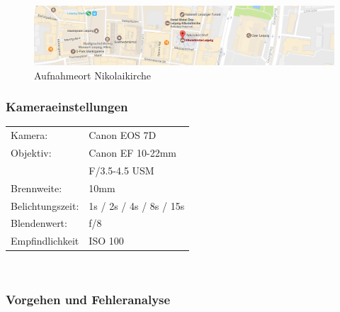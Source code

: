 \documentclass[liststotoc,bibtotoc,fontsize=14pt,]{scrreprt}
\begin{document}
\bisgskip

\begin{figure}[H]
	\includegraphics[width=\linewidth]{img/places/nikolai_map.jpg}
	\caption{Aufnahmeort Nikolaikirche}
	\label{img:ak_map}
\end{figure}

\subsubsection{Kameraeinstellungen}
\begin{minipage}{0.58\textwidth}
	\begin{tabular}{ll}
		Kamera: &Canon EOS 7D \\
		Objektiv: &Canon EF 10-22mm \\
		& F/3.5-4.5 USM\\		
		Brennweite:&  10mm \\
		Belichtungszeit: & 1s / 2s / 4s / 8s / 15s \\
		Blendenwert: & f/8\\
		Empfindlichkeit & ISO 100\\
	\end{tabular}\\
\end{minipage}%
\begin{minipage}{0.42\textwidth}
	
\end{minipage}%

\subsubsection{Vorgehen und Fehleranalyse}
\end{document}
